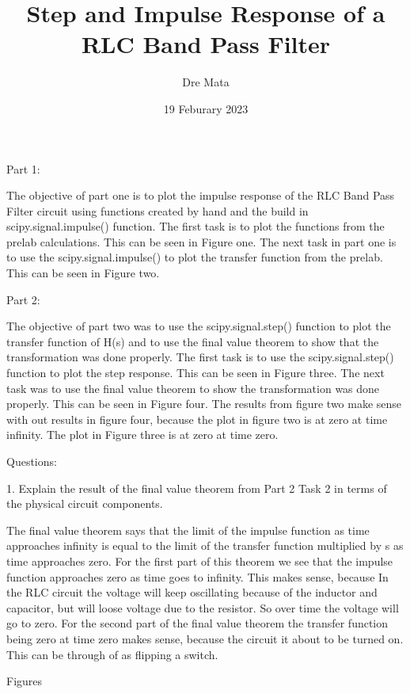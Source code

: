 \documentclass[nobib]{MSword}
\title{Step and Impulse Response of a RLC Band Pass Filter}
\author{Dre Mata}
\date{19 Feburary 2023}
\begin{document}
\maketitle
\begin{center}
    Part 1:
\end{center}
 The objective of part one is to plot the impulse response of the RLC Band Pass Filter circuit using functions created by hand and the build in scipy.signal.impulse() function. The first task is to plot the functions from the prelab calculations. This can be seen in Figure one. The next task in part one is to use the scipy.signal.impulse() to plot the transfer function from the prelab. This can be seen in Figure two.


\begin{center}
    Part 2:
\end{center}
The objective of part two was to use the scipy.signal.step() function to plot the transfer function of H(s) and to use the final value theorem to show that the transformation was done properly. The first task is to use the scipy.signal.step() function to plot the step response. This can be seen in Figure three. The next task was to use the final value theorem to show the transformation was done properly. This can be seen in Figure four. The results from figure two make sense with out results in figure four, because the plot in figure two is at zero at time infinity. The plot in Figure three is at zero at time zero.

\begin{center}
    Questions:
\end{center}
1. Explain the result of the final value theorem from Part 2 Task 2 in terms of the physical circuit components.

The final value theorem says that the limit of the impulse function as time approaches infinity is equal to the limit of the transfer function multiplied by s as time approaches zero. For the first part of this theorem we see that the impulse function approaches zero as time goes to infinity. This makes sense, because In the RLC circuit the voltage will keep oscillating because of the inductor and capacitor, but will loose voltage due to the resistor. So over time the voltage will go to zero. For the second part of the final value theorem the transfer function being zero at time zero makes sense, because the circuit it about to be turned on. This can be through of as flipping a switch.

\begin{center}
    Figures
\end{center}
\end{document}
